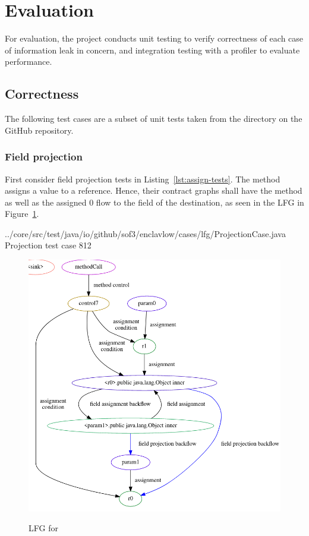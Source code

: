 \section{Evaluation}\label{sec:evaluation}
For evaluation, the project conducts unit testing
to verify correctness of each case of information leak in concern,
and integration testing with a profiler to evaluate performance.

\subsection{Correctness}
The following test cases are a subset of unit tests taken
from the  directory on the GitHub repository.

\subsubsection{Field projection}
First consider field projection tests in Listing~\ref{lst:assign-tests}.
The  method assigns a value to a reference.
Hence, their contract graphs shall have the method 
as well as the assigned  0 flow to the field of the destination,
as seen in the LFG in Figure~\ref{fig:param-to-param-lfg}.

{../core/src/test/java/io/github/sof3/enclavlow/cases/lfg/ProjectionCase.java}
{Projection test case}
{8}{12}

\begin{figure}
  \centering
  \caption{LFG for }
  \includegraphics[scale=0.35]{screenshot20201231224543.png}
  \label{fig:param-to-param-lfg}
\end{figure}

